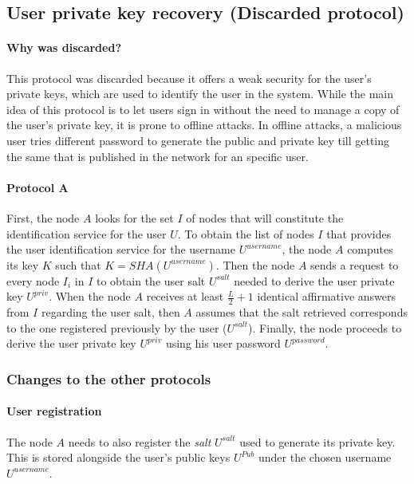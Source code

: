 \subsection{User private key recovery (Discarded protocol)}
\label{sec:private_key_recovery}
\paragraph{Why was discarded?}
This protocol was discarded because it offers a weak security for the user's
private keys, which are used to identify the user in the system.  While the main idea
of this protocol is to let users sign in without the need to
manage a copy of the user's private key, it is prone to offline attacks. In
offline attacks, a malicious user tries different password to generate the
public and private key till getting the same that is published in the network
for an specific user.

\paragraph{Protocol A}

First, the node $A$ looks for the set $I$ of nodes that will constitute the
identification service for the user $U$.
To obtain the list of nodes $I$ that provides the user identification service for
the username $U^{username}$, the node $A$ computes its key $K$ such that $K =
SHA(U^{username})$. 
Then the node $A$ sends a request to every node $I_i$ in $I$ to obtain the user
salt $U^{salt}$ needed to derive the user private key $U^{priv}$.
 When the node $A$ receives at least $\frac{L}{2} + 1$ identical affirmative answers from
$I$ regarding the user salt, then $A$ assumes that the salt retrieved
corresponds to the one registered previously by the user ($U^{salt}$). Finally,
the node proceeds to derive the user private key $U^{priv}$ using his user password $U^{password}$.


\subsubsection{Changes to the other protocols}
\paragraph{User registration}
The node $A$ needs to also register the \textit{salt} $U^{salt}$ used to
generate its private key. This is stored alongside the user's public keys $U^{Pub}$ under the
chosen username $U^{username}$.

